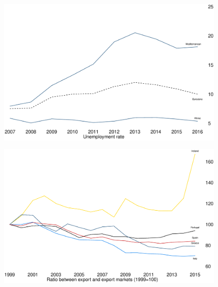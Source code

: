 \documentclass{beamer}
\begin{document}
\begin{frame}
  \begin{figure}
    \includegraphics[scale=.3]{unemployment.eps}
  \end{figure}
\end{frame}

\begin{frame}
  \begin{figure}
    \includegraphics[scale=.3]{pigs_exports.eps}
  \end{figure}
\end{frame}


\end{document}
